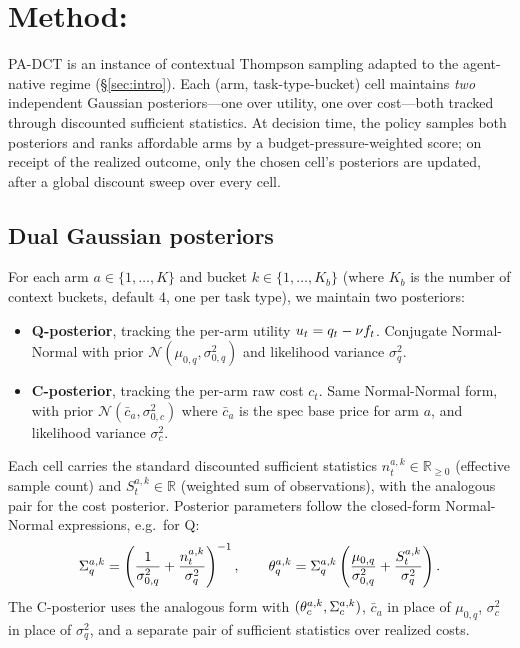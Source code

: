\section{Method: \padct{}}
\label{sec:method}

PA-DCT is an instance of contextual Thompson sampling adapted to the agent-native regime (\S\ref{sec:intro}). Each (arm, task-type-bucket) cell maintains \emph{two} independent Gaussian posteriors—one over utility, one over cost—both tracked through discounted sufficient statistics. At decision time, the policy samples both posteriors and ranks affordable arms by a budget-pressure-weighted score; on receipt of the realized outcome, only the chosen cell's posteriors are updated, after a global discount sweep over every cell.

\subsection{Dual Gaussian posteriors}
\label{sec:method-posteriors}

For each arm $a \in \{1,\ldots,K\}$ and bucket $k \in \{1,\ldots,K_b\}$ (where $K_b$ is the number of context buckets, default $4$, one per task type), we maintain two posteriors:
\begin{itemize}
\item \textbf{Q-posterior}, tracking the per-arm utility $u_t = q_t - \nu f_t$. Conjugate Normal-Normal with prior $\mathcal{N}(\mu_{0,q}, \sigma^2_{0,q})$ and likelihood variance $\sigma^2_q$.
\item \textbf{C-posterior}, tracking the per-arm raw cost $c_t$. Same Normal-Normal form, with prior $\mathcal{N}(\bar c_a, \sigma^2_{0,c})$ where $\bar c_a$ is the spec base price for arm $a$, and likelihood variance $\sigma^2_c$.
\end{itemize}

Each cell carries the standard discounted sufficient statistics $n^{a,k}_t \in \mathbb{R}_{\geq 0}$ (effective sample count) and $S^{a,k}_t \in \mathbb{R}$ (weighted sum of observations), with the analogous pair for the cost posterior. Posterior parameters follow the closed-form Normal-Normal expressions, e.g.\ for Q:
\begin{equation}
\label{eq:posterior-q}
\Sigma_q^{a,k} = \left(\frac{1}{\sigma^2_{0,q}} + \frac{n^{a,k}_t}{\sigma^2_q}\right)^{-1}, \qquad
\theta_q^{a,k} = \Sigma_q^{a,k} \left(\frac{\mu_{0,q}}{\sigma^2_{0,q}} + \frac{S^{a,k}_t}{\sigma^2_q}\right).
\end{equation}
The C-posterior uses the analogous form with $(\theta_c^{a,k}, \Sigma_c^{a,k})$, $\bar c_a$ in place of $\mu_{0,q}$, $\sigma^2_c$ in place of $\sigma^2_q$, and a separate pair of sufficient statistics over realized costs.

